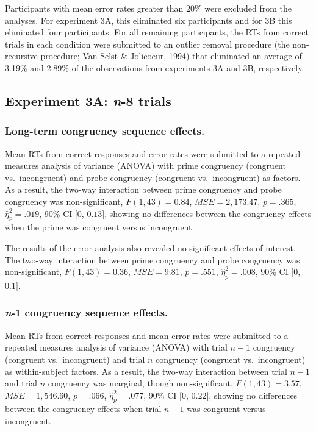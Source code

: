 \documentclass[]{DissertateCUNY}
\begin{document}
Participants with mean error rates greater than 20\% were excluded from
the analyses. For experiment 3A, this eliminated six participants and
for 3B this eliminated four participants. For all remaining
participants, the RTs from correct trials in each condition were
submitted to an outlier removal procedure (the non-recursive procedure;
Van Selst \& Jolicoeur, 1994) that eliminated an average of 3.19\% and
2.89\% of the observations from experiments 3A and 3B, respectively.

\hypertarget{experiment-3a--8-trials}{%
\subsection{\texorpdfstring{Experiment 3A: \textit{n}-8
trials}{Experiment 3A: -8 trials}}\label{experiment-3a--8-trials}}

\hypertarget{long-term-congruency-sequence-effects.-2}{%
\subsubsection{Long-term congruency sequence
effects.}\label{long-term-congruency-sequence-effects.-2}}

Mean RTs from correct responses and error rates were submitted to a
repeated measures analysis of variance (ANOVA) with prime congruency
(congruent vs.~incongruent) and probe congruency (congruent
vs.~incongruent) as factors. As a result, the two-way interaction
between prime congruency and probe congruency was non-significant,
\(F(1, 43) = 0.84\), \(\mathit{MSE} = 2,173.47\), \(p = .365\),
\(\hat{\eta}^2_p = .019\), 90\% CI \([0\), \(0.13]\), showing no
differences between the congruency effects when the prime was congruent
versus incongruent.

The results of the error analysis also revealed no significant effects
of interest. The two-way interaction between prime congruency and probe
congruency was non-significant, \(F(1, 43) = 0.36\),
\(\mathit{MSE} = 9.81\), \(p = .551\), \(\hat{\eta}^2_p = .008\), 90\%
CI \([0\), \(0.1]\).

\hypertarget{congruency-sequence-effects.-3}{%
\subsubsection{\texorpdfstring{\textit{n}-1 congruency sequence
effects.}{-1 congruency sequence effects.}}\label{congruency-sequence-effects.-3}}

Mean RTs from correct responses and mean error rates were submitted to a
repeated measures analysis of variance (ANOVA) with trial \(n-1\)
congruency (congruent vs.~incongruent) and trial \(n\) congruency
(congruent vs.~incongruent) as within-subject factors. As a result, the
two-way interaction between trial \(n-1\) and trial \(n\) congruency was
marginal, though non-significant, \(F(1, 43) = 3.57\),
\(\mathit{MSE} = 1,546.60\), \(p = .066\), \(\hat{\eta}^2_p = .077\),
90\% CI \([0\), \(0.22]\), showing no differences between the congruency
effects when trial \(n-1\) was congruent versus incongruent.
\end{document}

